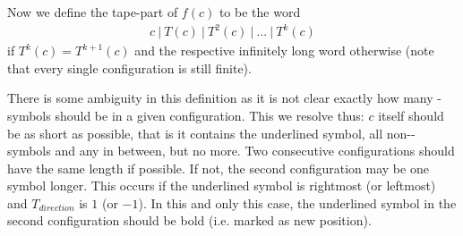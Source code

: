 	Now we define the tape-part of $f(c)$ to be the word
	\begin{align*}
		c~|~T(c)~|~T^2(c)~|~...~|~T^k(c)
	\end{align*}
	if $T^k(c) = T^{k+1}(c)$ and the respective infinitely long word otherwise (note that every single configuration is still finite).

	There is some ambiguity in this definition as it is not clear exactly how many \EMP-symbols should be in a given configuration.
	This we resolve thus: $c$ itself should be as short as possible, that is it contains the underlined symbol, all non-\EMP-symbols and any \EMP in between, but no more.
	Two consecutive configurations should have the same length if possible. If not, the second configuration may be one symbol longer.
	This occurs if the underlined symbol is rightmost (or leftmost) and $T_{direction}$ is $1$ (or $-1$).
	In this and only this case, the underlined symbol in the second configuration should be bold (i.e. marked as new position).


\newpage


\endproof



